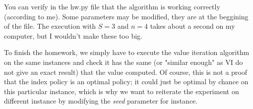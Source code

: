 \documentclass[12pt]{article}
\begin{document}
You can verify in the hw.py file that the algorithm is working correctly (according to me). Some parameters may be modified, they are at the beggining of the file. The execution with $S=3$ and $n=4$ takes about a second on my computer, but I wouldn't make these too big. 

To finish the homework, we simply have to execute the value iteration algorithm on the same instances and check it has the same (or "similar enough" as VI do not give an exact result) that the value computed. Of course, this is not a proof that the index policy is an optimal policy; it could just be optimal by chance on this particular instance, which is why we want to reiterate the experiment on different instance by modifying the \textit{seed} parameter for instance. 
\end{document}
